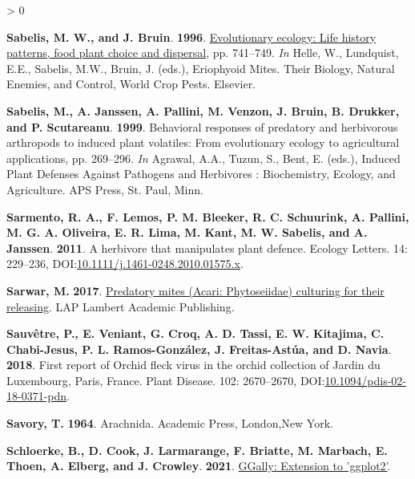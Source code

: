 \documentclass{ufdissertation}[overrideChapters] %
\newlength{\cslhangindent}
\newenvironment{CSLReferences}[2] %
 {%
  \setlength{\parindent}{0pt}
  \ifodd #1 \everypar{\setlength{\hangindent}{\cslhangindent}}\ignorespaces\fi
  \ifnum #2 > 0
  \setlength{\parskip}{#2\baselineskip}
  \fi
 }%
 {}
\begin{document}
{\begin{CSLReferences}{1}{1}
\leavevmode{}%
\textbf{Sabelis, M. W., and J. Bruin}. \textbf{1996}. \href{https://doi.org/10.1016/s1572-4379(96)80050-9}{Evolutionary ecology: Life history patterns, food plant choice and dispersal}, pp. 741--749. \emph{In} Helle, W., Lundquist, E.E., Sabelis, M.W., Bruin, J. (eds.), Eriophyoid Mites. Their Biology, Natural Enemies, and Control, World Crop Pests. Elsevier.

\leavevmode{}%
\textbf{Sabelis, M., A. Janssen, A. Pallini, M. Venzon, J. Bruin, B. Drukker, and P. Scutareanu}. \textbf{1999}. Behavioral responses of predatory and herbivorous arthropods to induced plant volatiles: From evolutionary ecology to agricultural applications, pp. 269--296. \emph{In} Agrawal, A.A., Tuzun, S., Bent, E. (eds.), Induced Plant Defenses Against Pathogens and Herbivores : Biochemistry, Ecology, and Agriculture. APS Press, St. Paul, Minn.

\leavevmode{}%
\textbf{Sarmento, R. A., F. Lemos, P. M. Bleeker, R. C. Schuurink, A. Pallini, M. G. A. Oliveira, E. R. Lima, M. Kant, M. W. Sabelis, and A. Janssen}. \textbf{2011}. A herbivore that manipulates plant defence. Ecology Letters. 14: 229--236, DOI:\href{https://doi.org/10.1111/j.1461-0248.2010.01575.x}{10.1111/j.1461-0248.2010.01575.x}.

\leavevmode{}%
\textbf{Sarwar, M.} \textbf{2017}. \href{https://www.ebook.de/de/product/29856502/muhammad_sarwar_predatory_mites_\%7BAcari\%7D_\%7BPhytoseiidae\%7D_culturing_for_their_releasing.html}{Predatory mites ({Acari}: {Phytoseiidae}) culturing for their releasing}. LAP Lambert Academic Publishing.

\leavevmode{}%
\textbf{Sauvêtre, P., E. Veniant, G. Croq, A. D. Tassi, E. W. Kitajima, C. Chabi-Jesus, P. L. Ramos-González, J. Freitas-Astúa, and D. Navia}. \textbf{2018}. First report of {Orchid fleck virus} in the orchid collection of {Jardin du Luxembourg}, {Paris, France}. Plant Disease. 102: 2670--2670, DOI:\href{https://doi.org/10.1094/pdis-02-18-0371-pdn}{10.1094/pdis-02-18-0371-pdn}.

\leavevmode{}%
\textbf{Savory, T.} \textbf{1964}. Arachnida. Academic Press, London,New York.

\leavevmode{}%
\textbf{Schloerke, B., D. Cook, J. Larmarange, F. Briatte, M. Marbach, E. Thoen, A. Elberg, and J. Crowley}. \textbf{2021}. \href{https://CRAN.R-project.org/package=GGally}{{GGally}: Extension to 'ggplot2'}.


\end{CSLReferences}}
\end{document}
